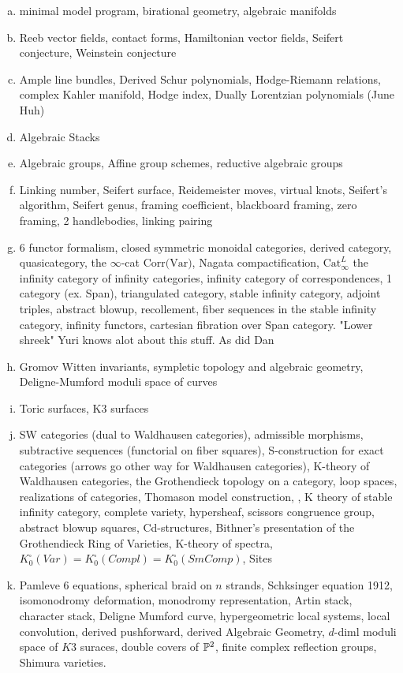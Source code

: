 \documentclass[12pt]{article}
\begin{document}
\begin{enumerate}[(a)]
    \item minimal model program, birational geometry, algebraic manifolds
    \item Reeb vector fields, contact forms, Hamiltonian vector fields, Seifert conjecture, Weinstein conjecture
    \item Ample line bundles, Derived Schur polynomials, Hodge-Riemann relations, complex Kahler manifold, Hodge index, Dually Lorentzian polynomials (June Huh)
    \item Algebraic Stacks
    \item Algebraic groups, Affine group schemes, reductive algebraic groups
    \item Linking number, Seifert surface, Reidemeister moves, virtual knots, Seifert's algorithm, Seifert genus, framing coefficient, blackboard framing, zero framing, 2 handlebodies, linking pairing
    \item 6 functor formalism, closed symmetric monoidal categories, derived category, quasicategory, the $\infty$-cat $\text{Corr(Var)}$, Nagata compactification, $\text{Cat}^L_\infty$ the infinity category of infinity categories, infinity category of correspondences, 1 category (ex. Span), triangulated category, stable infinity category, adjoint triples, abstract blowup, recollement, fiber sequences in the stable infinity category, infinity functors, cartesian fibration over Span category. "Lower shreek" Yuri knows alot about this stuff. As did Dan
    \item Gromov Witten invariants, sympletic topology and algebraic geometry, Deligne-Mumford moduli space of curves 
    \item Toric surfaces, K3 surfaces
    \item SW categories (dual to Waldhausen categories), admissible morphisms, subtractive sequences (functorial on fiber squares), S-construction for exact categories (arrows go other way for Waldhausen categories), K-theory of Waldhausen categories, the Grothendieck topology on a category, loop spaces, realizations of categories, Thomason model construction, , K theory of stable infinity category, complete variety, hypersheaf, scissors congruence group, abstract blowup squares, Cd-structures, Bithner's presentation of the Grothendieck Ring of Varieties, K-theory of spectra, $K^\square_0(Var) = K^\square_0(Compl) = K^\square_0(SmComp)$, Sites
    \item Pamleve 6 equations, spherical braid on $n$ strands, Schksinger equation 1912, isomonodromy deformation, monodromy representation, Artin stack, character stack, Deligne Mumford curve, hypergeometric local systems, local convolution, derived pushforward, derived Algebraic Geometry, $d$-diml moduli space of $K3$ suraces, double covers of $\P^2$, finite complex reflection groups, Shimura varieties.

\end{enumerate}
\end{document}
